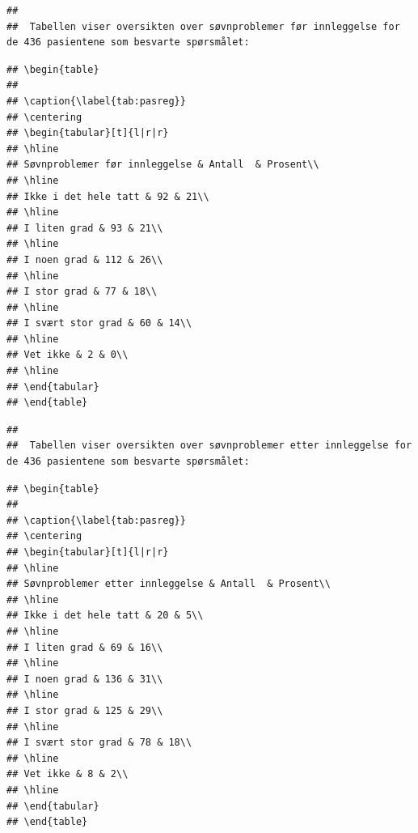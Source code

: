 \documentclass[
]{article}
\begin{document}
\begin{verbatim}
## 
##  Tabellen viser oversikten over søvnproblemer før innleggelse for de 436 pasientene som besvarte spørsmålet:
\end{verbatim}

\begin{verbatim}
## \begin{table}
## 
## \caption{\label{tab:pasreg}}
## \centering
## \begin{tabular}[t]{l|r|r}
## \hline
## Søvnproblemer før innleggelse & Antall  & Prosent\\
## \hline
## Ikke i det hele tatt & 92 & 21\\
## \hline
## I liten grad & 93 & 21\\
## \hline
## I noen grad & 112 & 26\\
## \hline
## I stor grad & 77 & 18\\
## \hline
## I svært stor grad & 60 & 14\\
## \hline
## Vet ikke & 2 & 0\\
## \hline
## \end{tabular}
## \end{table}
\end{verbatim}

\begin{verbatim}
## 
##  Tabellen viser oversikten over søvnproblemer etter innleggelse for de 436 pasientene som besvarte spørsmålet:
\end{verbatim}

\begin{verbatim}
## \begin{table}
## 
## \caption{\label{tab:pasreg}}
## \centering
## \begin{tabular}[t]{l|r|r}
## \hline
## Søvnproblemer etter innleggelse & Antall  & Prosent\\
## \hline
## Ikke i det hele tatt & 20 & 5\\
## \hline
## I liten grad & 69 & 16\\
## \hline
## I noen grad & 136 & 31\\
## \hline
## I stor grad & 125 & 29\\
## \hline
## I svært stor grad & 78 & 18\\
## \hline
## Vet ikke & 8 & 2\\
## \hline
## \end{tabular}
## \end{table}
\end{verbatim}
\end{document}
